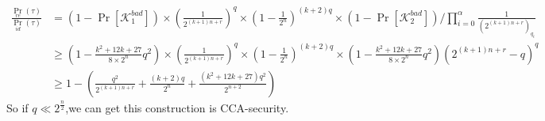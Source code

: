 \documentclass{article}
\begin{document}
\begin{align*}
\frac{\Pr_{re}(\tau)}{\Pr_{id}(\tau)}&= (1-\Pr[\mathcal{K}_{1}^{bad}])\times(\frac{1}{2^{(k+1)n+r}})^{q}\times(1-\frac{1}{2^{n}})^{(k+2)q}\times
(1-\Pr[\mathcal{K}_{2}^{bad}]) / \prod_{i=0}^{\alpha}\frac{1}{(2^{(k+1)n+r})_{q_{i}}}\\
&\geq (1-\frac{k^{2}+12k+27}{8\times2^{n}}q^{2})\times(\frac{1}{2^{(k+1)n+r}})^{q}\times(1-\frac{1}{2^{n}})^{(k+2)q}\times
(1-\frac{k^{2}+12k+27}{8\times2^{n}}q^{2})(2^{(k+1)n+r}-q)^{q}\\
 &\geq 1-( \frac{q^{2}}{2^{(k+1)n+r}}+\frac{(k+2)q}{2^{n}} +\frac{(k^{2}+12k+27)q^{2}}{2^{n+2}})
\end{align*}
So if $q \ll 2^{\frac{n}{2}}$,we can get this construction is CCA-security.\\
\end{document}
